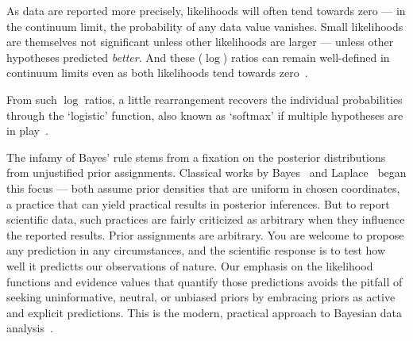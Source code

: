 As data are reported more precisely, likelihoods will often tend towards zero
--- in the continuum limit, the probability of any data value vanishes.
Small likelihoods are themselves not significant unless other likelihoods
are larger --- unless other hypotheses predicted \emph{better}.
And these ($\log$) ratios can remain well-defined in continuum limits even as
both likelihoods tend towards zero~\cite{billingsley2008probability}.

From such $\log$ ratios, a little rearrangement recovers the individual
probabilities through the `logistic' function, also known as
`softmax' if multiple hypotheses are in play~\cite{MurphyKevinP.2012Mlap}.

The infamy of Bayes' rule stems from a fixation on the posterior distributions
from unjustified prior assignments.
Classical works by
Bayes~\cite{bayes1763lii} and
Laplace~\cite{laplace1774stigler} began this focus ---
both assume prior densities that are uniform in chosen coordinates, a practice
that can yield practical results in posterior inferences.
But to report scientific data, such practices are fairly criticized as
arbitrary when they influence the reported results.
Prior assignments are arbitrary.
You are welcome to propose any prediction in any circumstances, and the
scientific response is to test how well it predictts our observations of nature.
Our emphasis on the likelihood functions and evidence values that quantify
those predictions avoids the pitfall of seeking uninformative, neutral, or
unbiased priors by embracing priors as active and explicit predictions.
This is the modern, practical approach to Bayesian data analysis~\cite{
mackay2003information,
skilling2004nested,
skilling2006nested,
sivia2006data,
skilling2010foundations
}.

